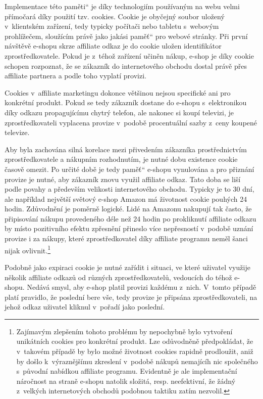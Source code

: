 \documentclass[12pt,oneside,openany]{fithesis}
\begin{document}
Implementace této \glqq paměti\textquotedblleft{} je díky technologiím 
používaným na webu velmi přímočará díky použití tzv. cookies. Cookie 
je obyčejný soubor uložený v~klientském zařízení, tedy typicky 
počítači nebo tabletu s~webovým prohlížečem, sloužícím právě jako 
jakási \glqq paměť\textquotedblleft{} pro webové stránky. 
\cite{rfc-cookie}{} Při první návštěvě e-shopu skrze affiliate odkaz je 
do cookie uložen identifikátor zprostředkovatele. Pokud je z~téhož 
zařízení učiněn nákup, e-shop je díky cookie schopen rozpoznat, že se 
zákazník do internetového obchodu dostal právě přes affiliate partnera a 
podle toho vyplatí provizi.

Cookies v~affiliate marketingu dokonce většinou nejsou specifické ani pro 
konkrétní produkt. Pokud se tedy zákazník dostane do e-shopu s~elektronikou 
díky odkazu propagujícímu chytrý telefon, ale nakonec si koupí televizi, 
je zprostředkovateli vyplacena provize v~podobě procentuální sazby z~ceny 
koupené televize.

Aby byla zachována silná korelace mezi přivedením zákazníka 
prostřednictvím zprostředkovatele a nákupním rozhodnutím, je nutné dobu 
existence cookie časově omezit. Po určité době je tedy \glqq 
paměť\textquotedblleft{} e-shopu vynulována a pro přiznání provize je 
nutné, aby zákazník znovu využil affiliate odkaz. Tato doba se liší podle 
povahy a především velikosti internetového obchodu. Typicky je to 30 dní, 
ale například největší světový e-shop Amazon má životnost cookie 
pouhých 24 hodin. \cite{amazon-cookie}{} Zdůvodnění je poměrně logické. 
Lidé na Amazonu nakupují tak často, že připisování nákupu provedeného 
déle než 24 hodin po prokliknutí affiliate odkazu by místo pozitivního 
efektu zpřesnění přineslo více nepřesností v~podobě uznání provize i 
za nákupy, které zprostředkovatel díky affiliate programu neměl šanci 
nijak ovlivnit.\footnote{
    Zajímavým zlepšením tohoto problému by nepochybně bylo vytvoření 
unikátních cookies pro konkrétní produkt. Lze odůvodněně předpokládat, 
že v~takovém případě by bylo možné životnost cookies rapidně 
prodloužit, aniž by došlo k~výraznějšímu zkreslení v~podobě nákupů 
nemajícíh nic společného s~původní nabídkou affiliate programu. 
Evidentně je ale implementační náročnost na straně e-shopu natolik 
složitá, resp. neefektivní, že žádný z~velkých internetových obchodů 
podobnou taktiku zatím nezvolil.}

Podobně jako expiraci cookie je nutné zařídit i situaci, ve které 
uživatel využije několik affiliate odkazů od různých zprostředkovatelů, 
vedoucích do téhož e-shopu. Nedává smysl, aby e-shop platil provizi 
každému z~nich. V~tomto případě platí pravidlo, že poslední bere vše, 
tedy provize je připsána zprostředkovateli, na jehož odkaz uživatel 
kliknul v~pořadí jako poslední.
\end{document}
